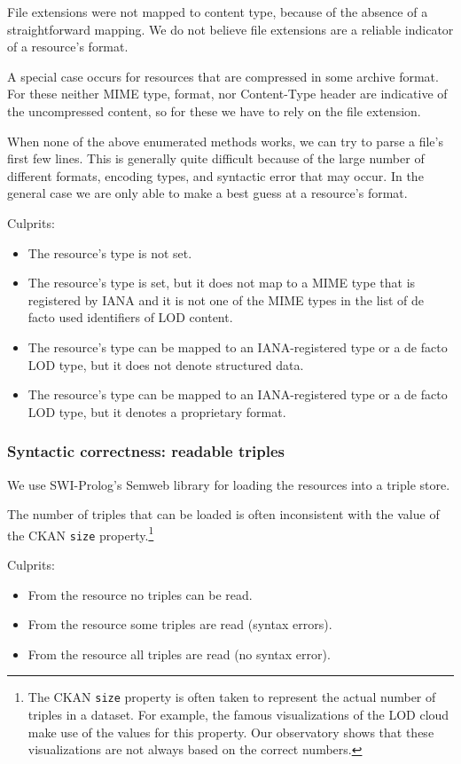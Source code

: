 
File extensions were not mapped to content type,
 because of the absence of a straightforward mapping.
We do not believe file extensions are a reliable indicator
 of a resource's format.

A special case occurs for resources that are compressed
 in some archive format.
For these neither MIME type, format, nor Content-Type header
 are indicative of the uncompressed content,
 so for these we have to rely on the file extension.

When none of the above enumerated methods works,
 we can try to parse a file's first few lines.
This is generally quite difficult because of the large number
 of different formats, encoding types, and syntactic error that may occur.
In the general case we are only able to make a best guess at
 a resource's format.

Culprits:
\begin{itemize}[noitemsep,nolistsep]
  \item The resource's type is not set.
  \item The resource's type is set, but it does not map to a MIME type
         that is registered by IANA and it is not one of the MIME types
         in the list of de facto used identifiers of LOD content.
  \item The resource's type can be mapped to an IANA-registered type
         or a de facto LOD type, but it does not denote structured data.
  \item The resource's type can be mapped to an IANA-registered type
         or a de facto LOD type, but it denotes a proprietary format.
\end{itemize}

\subsubsection*{Syntactic correctness: readable triples}

We use SWI-Prolog's Semweb library \cite{wielemaker2003}
 for loading the resources into a triple store.

The number of triples that can be loaded is often inconsistent with
 the value of the CKAN \texttt{size} property.\footnote{The CKAN
    \texttt{size} property is often taken to represent the actual number
    of triples in a dataset.
   For example, the famous visualizations of the LOD cloud make use of
    the values for this property.
   Our observatory shows that these visualizations are not always based
    on the correct numbers.}

Culprits:
\begin{itemize}[noitemsep,nolistsep]
  \item From the resource no triples can be read.
  \item From the resource some triples are read (syntax errors).
  \item From the resource all triples are read (no syntax error).
\end{itemize}

